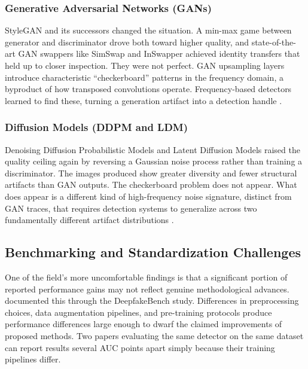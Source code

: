 \subsubsection{Generative Adversarial Networks (GANs)}
StyleGAN and its successors changed the situation. A min-max game between generator and discriminator drove both toward higher quality, and state-of-the-art GAN swappers like SimSwap and InSwapper achieved identity transfers that held up to closer inspection. They were not perfect. GAN upsampling layers introduce characteristic ``checkerboard'' patterns in the frequency domain, a byproduct of how transposed convolutions operate. Frequency-based detectors learned to find these, turning a generation artifact into a detection handle \citep{Zhao2021MultiAttentional, Sun2024ForgeryTrace}.

\subsubsection{Diffusion Models (DDPM and LDM)}
Denoising Diffusion Probabilistic Models and Latent Diffusion Models raised the quality ceiling again by reversing a Gaussian noise process rather than training a discriminator. The images produced show greater diversity and fewer structural artifacts than GAN outputs. The checkerboard problem does not appear. What does appear is a different kind of high-frequency noise signature, distinct from GAN traces, that requires detection systems to generalize across two fundamentally different artifact distributions \citep{Yan2024DF40, Li2024DiffSeg, Shiohara2025ExposeAnyone}.

\subsection{Benchmarking and Standardization Challenges}
One of the field's more uncomfortable findings is that a significant portion of reported performance gains may not reflect genuine methodological advances. \citet{Yan2023DeepfakeBench} documented this through the DeepfakeBench study. Differences in preprocessing choices, data augmentation pipelines, and pre-training protocols produce performance differences large enough to dwarf the claimed improvements of proposed methods. Two papers evaluating the same detector on the same dataset can report results several AUC points apart simply because their training pipelines differ.

